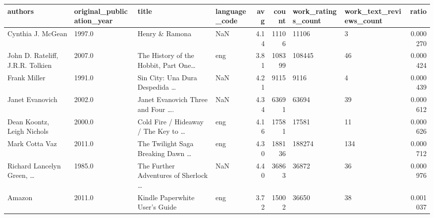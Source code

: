 \documentclass[11pt]{article}
\begin{document}
\begin{table}
\begin{tabular}{lHlHrrHHr}
\toprule
                                  authors &  original\_publication\_year &                                      title & language\_code &  avg &  count &  work\_ratings\_count &  work\_text\_reviews\_count &  ratio \\
\midrule
                                 Cynthia J. McGean &                     1997.0 &                                     Henry \& Ramona &           NaN &            4.14 &          11106 &               11106 &                        3 &       0.000270 \\
                  John D. Rateliff, J.R.R. Tolkien &                     2007.0 &   The History of the Hobbit, Part One\ldots &           eng &            3.81 &         108399 &              108445 &                       46 &       0.000424 \\
                                      Frank Miller &                     1991.0 &              Sin City: Una Dura Despedida \ldots &           NaN &            4.21 &           9115 &                9116 &                        4 &       0.000439 \\
                                   Janet Evanovich &                     2002.0 &  Janet Evanovich Three and Four \ldots. &           NaN &            4.34 &          63691 &               63694 &                       39 &       0.000612 \\
                        Dean Koontz, Leigh Nichols &                     2000.0 &         Cold Fire / Hideaway / The Key to \ldots &           eng &            4.16 &          17581 &               17581 &                       11 &       0.000626 \\
                                    Mark Cotta Vaz &                     2011.0 &  The Twilight Saga Breaking Dawn \ldots &           eng &            4.30 &         188136 &              188274 &                      134 &       0.000712 \\
 Richard Lancelyn Green, \ldots &                     1985.0 &  The Further Adventures of Sherlock \ldots &           NaN &            4.40 &          36863 &               36872 &                       36 &       0.000976 \\
                                            Amazon &                     2011.0 &                     Kindle Paperwhite User's Guide &           eng &            3.72 &          15002 &               36650 &                       38 &       0.001037 \\

\end{tabular}
\end{table}
\end{document}
